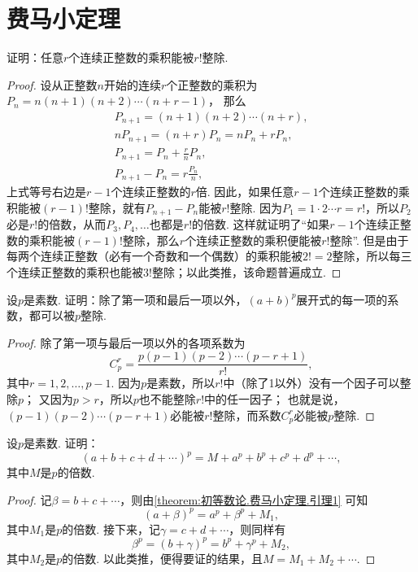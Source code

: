 \section{费马小定理}
\begin{lemma}\label{theorem:初等数论.费马小定理.引理0}
证明：任意\(r\)个连续正整数的乘积能被\(r!\)整除.
\begin{proof}
设从正整数\(n\)开始的连续\(r\)个正整数的乘积为\(P_n = n(n+1)(n+2)\dotsm(n+r-1)\)，
那么\begin{gather*}
	P_{n+1} = (n+1)(n+2)\dotsm(n+r), \\
	n P_{n+1} = (n+r) P_n = n P_n + r P_n, \\
	P_{n+1} = P_n + \frac{r}{n} P_n, \\
	P_{n+1} - P_n = r \frac{P_n}{n},
\end{gather*}
上式等号右边是\(r-1\)个连续正整数的\(r\)倍.
因此，如果任意\(r-1\)个连续正整数的乘积能被\((r-1)!\)整除，就有\(P_{n+1} - P_n\)能被\(r!\)整除.
因为\(P_1 = 1 \cdot 2 \dotsm r = r!\)，所以\(P_2\)必是\(r!\)的倍数，从而\(P_3,P_4,\dotsc\)也都是\(r!\)的倍数.
这样就证明了“如果\(r-1\)个连续正整数的乘积能被\((r-1)!\)整除，那么\(r\)个连续正整数的乘积便能被\(r!\)整除”.
但是由于每两个连续正整数（必有一个奇数和一个偶数）的乘积能被\(2!=2\)整除，所以每三个连续正整数的乘积也能被\(3!\)整除；以此类推，该命题普遍成立.
\end{proof}
\end{lemma}

\begin{lemma}\label{theorem:初等数论.费马小定理.引理1}
设\(p\)是素数.
证明：除了第一项和最后一项以外，\((a+b)^p\)展开式的每一项的系数，都可以被\(p\)整除.
\begin{proof}
除了第一项与最后一项以外的各项系数为\begin{equation*}
C_p^r = \frac{p(p-1)(p-2)\dotsm(p-r+1)}{r!},
\end{equation*}其中\(r=1,2,\dotsc,p-1\).
因为\(p\)是素数，所以\(r!\)中（除了1以外）没有一个因子可以整除\(p\)；
又因为\(p>r\)，所以\(p\)也不能整除\(r!\)中的任一因子；
也就是说，\((p-1)(p-2)\dotsm(p-r+1)\)必能被\(r!\)整除，而系数\(C_p^r\)必能被\(p\)整除.
\end{proof}
\end{lemma}

\begin{lemma}\label{theorem:初等数论.费马小定理.引理2}
设\(p\)是素数.
证明：\begin{equation*}
(a+b+c+d+\dotsb)^p = M + a^p + b^p + c^p + d^p + \dotsb,
\end{equation*}其中\(M\)是\(p\)的倍数.
\begin{proof}
记\(\beta=b+c+\dotsb\)，则由\cref{theorem:初等数论.费马小定理.引理1} 可知\begin{equation*}
(a+\beta)^p = a^p + \beta^p + M_1,
\end{equation*}其中\(M_1\)是\(p\)的倍数.
接下来，记\(\gamma=c+d+\dotsb\)，则同样有\begin{equation*}
\beta^p = (b+\gamma)^p = b^p + \gamma^p + M_2,
\end{equation*}其中\(M_2\)是\(p\)的倍数.
以此类推，便得要证的结果，且\(M = M_1+M_2+\dotsb\).
\end{proof}
\end{lemma}

